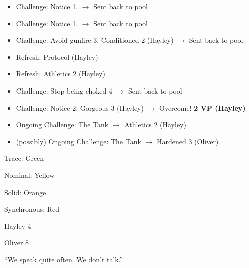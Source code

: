 {\begin{itemize}
\item Challenge: Notice 1.  $\rightarrow$ Sent back to pool
\item Challenge: Notice 1.  $\rightarrow$ Sent back to pool
\end{itemize}

\begin{itemize}
\item Challenge: Avoid gunfire 3. Conditioned 2 (Hayley) $\rightarrow$ Sent back to pool
\item Refresh: Protocol (Hayley)
\item Refresh: Athletics 2 (Hayley)
\item Challenge: Stop being choked 4 $\rightarrow$ Sent back to pool
\item Challenge: Notice 2. Gorgeous 3 (Hayley) $\rightarrow$ Overcome! \textbf{2 VP (Hayley)} 
\end{itemize}
}



\begin{itemize}
\item Ongoing Challenge: The Tank $\rightarrow$ Athletics 2 (Hayley)
\item (possibly) Ongoing Challenge: The Tank $\rightarrow$ Hardened 3 (Oliver)
\end{itemize}




{
\parskip=0pt
Trace: Green

Nominal: Yellow

Solid: Orange

Synchronous: Red
}



{\parskip=0pt
Hayley 4

Oliver 8
}







``We speak quite often.  We don't talk.''





